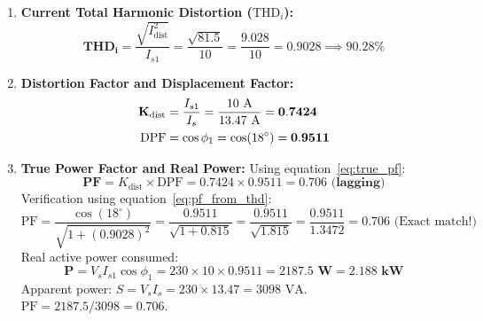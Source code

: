 \documentclass[11pt,a4paper]{article}
\begin{document}
\begin{examplebox}
\begin{enumerate}
  \item \textbf{Current Total Harmonic Distortion ($\text{THD}_i$):}
  \begin{equation*}
  \mathbf{\text{THD}_i} = \frac{\sqrt{I_{\text{dist}}^2}}{I_{s1}} = \frac{\sqrt{81.5}}{10} = \frac{9.028}{10} = 0.9028 \implies \mathbf{90.28\%}
  \end{equation*}

  \item \textbf{Distortion Factor and Displacement Factor:}
  \begin{align*}
  \mathbf{K_{\text{dist}}} &= \frac{I_{s1}}{I_s} = \frac{10\text{ A}}{13.47\text{ A}} = \mathbf{0.7424} \notag\\
  \mathbf{\text{DPF}} &= \cos\phi_1 = \cos(18^\circ) = \mathbf{0.9511}
  \end{align*}

  \item \textbf{True Power Factor and Real Power:}
  Using equation~\eqref{eq:true_pf}:
  \begin{equation*}
  \mathbf{\text{PF}} = K_{\text{dist}} \times \text{DPF} = 0.7424 \times 0.9511 = \mathbf{0.706\text{ (lagging)}}
  \end{equation*}
  Verification using equation~\eqref{eq:pf_from_thd}:
  \begin{equation*}
  \text{PF} = \frac{\cos(18^\circ)}{\sqrt{1 + (0.9028)^2}} = \frac{0.9511}{\sqrt{1 + 0.815}} = \frac{0.9511}{\sqrt{1.815}} = \frac{0.9511}{1.3472} = 0.706\text{ (Exact match!)}
  \end{equation*}
  Real active power consumed:
  \begin{equation*}
  \mathbf{P} = V_s I_{s1} \cos\phi_1 = 230 \times 10 \times 0.9511 = \mathbf{2187.5\text{ W} = 2.188\text{ kW}}
  \end{equation*}
  Apparent power: $S = V_s I_s = 230 \times 13.47 = 3098\text{ VA}$. $\text{PF} = 2187.5 / 3098 = 0.706$.
\end{enumerate}
\end{examplebox}
\end{document}
